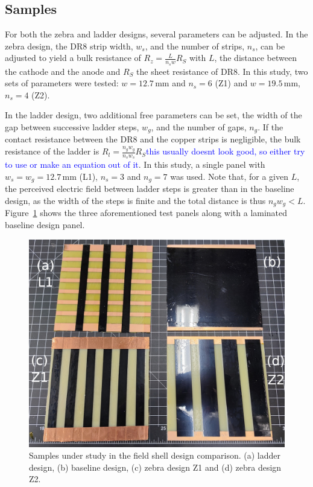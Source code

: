 \documentclass[a4paper,12pt]{article}
\newcommand{\DR}{DR8}
\newcommand{\RI}[1]{\textcolor{blue}{#1}}
\begin{document}



\subsection{Samples}
\label{sec:alt_samples}
For both the zebra and ladder designs, several parameters can be adjusted. In the zebra design, the {\DR} strip width, $w_s$, and the number of strips, $n_s$, can be adjusted to yield a bulk resistance of $R_z=\frac{L}{n_sw}R_S$ with $L$, the distance between the cathode and the anode and $R_S$ the sheet resistance of {\DR}. In this study, two sets of parameters were tested: $w=12.7\,$mm and $n_s=6$ (Z1) and $w=19.5$\,mm, $n_s=4$ (Z2).

In the ladder design, two additional free parameters can be set, the width of the gap between successive ladder steps, $w_g$, and the number of gaps, $n_g$. If the contact resistance between the {\DR} and the copper strips is negligible, the bulk resistance of the ladder is $R_l=\frac{n_gw_g}{n_sw_s}R_S$\RI{this usually doesnt look good, so either try to use \sfrac{1}{2} or make an equation out of it}. In this study, a single panel with $w_s=w_g=12.7\,$mm (L1), $n_s=3$ and $n_g=7$ was used. Note that, for a given $L$, the perceived electric field between ladder steps is greater than in the baseline design, as the width of the steps is finite and the total distance is thus $n_gw_g<L$. Figure~\ref{fig:shell_designs_picture} shows the three aforementioned test panels along with a laminated baseline design panel.

\begin{figure}[htbp]
\centering
\includegraphics[width=.75\linewidth]{field_shell_designs.jpg}
\caption{Samples under study in the field shell design comparison. (a) ladder design, (b) baseline design, (c) zebra design Z1 and (d) zebra design Z2.}
\label{fig:shell_designs_picture}
\end{figure}
\end{document}
